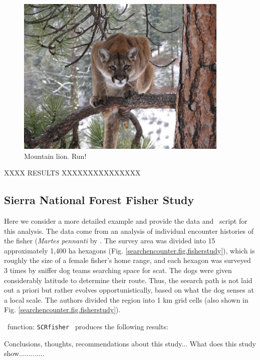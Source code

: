 \begin{figure}
\centering
\includegraphics[height=3in]{Ch15-searchencounter/figs/mountain_lion.jpg}
\caption{
Mountain lion.
Run!
}
\label{searchencounter.fig.lion}
\end{figure}

XXXX RESULTS XXXXXXXXXXXXXXX

\subsection{Sierra National Forest Fisher Study}

Here we consider a more detailed example and provide the data and
\R~script for this analysis.  The data come from an analysis of
individual encounter histories of the fisher ({\it Martes pennanti} by
\citet{thompson_etal:2012}.  The survey area was divided into 15
approximately 1,400 ha hexagons
(Fig. \ref{searchencounter.fig.fisherstudy}), which is roughly the
size of a female fisher's home range, and each hexagon was surveyed 3
times by sniffer dog teams searching space for scat. The dogs were
given considerably latitude to determine their route.  Thus, the
seearch path is not laid out a priori but rather evolves
opportunistically, based on what the dog senses at a local scale.  The
authors divided the region into 1 km grid cells (also shown in Fig.
\ref{searchencounter.fig.fisherstudy}).

\R~function: \mbox{\tt SCRfisher  } produces the following results:

Conclusions, thoughts, recommendations about this study...
What does this study show.............


